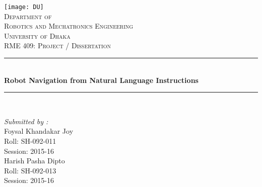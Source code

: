 \begin{titlepage}
		\newcommand{\HRule}{\rule{\linewidth}{0.1mm}}
		\centering %
		
		\centering
		\texttt{[image: DU]}\\
		\textsc{\Large Department of\\ Robotics and Mechatronics Engineering}\\[0.5cm]
		\textsc{\LARGE University of Dhaka}\\[1.cm]
		
		\textsc{\Large RME 409: Project / Dissertation}\\[0.5cm] %
		
		\HRule \\[.5cm]
		{ \LARGE \bfseries Robot Navigation from Natural Language Instructions}\\[0.1cm] %
		\HRule \\[1.5cm]
		
		
		\begin{minipage}{0.4\textwidth}
            \begin{flushleft} \large
                
                \emph{Submitted by :}\\
                Foysal Khandakar Joy\\
                Roll: SH-092-011\\
                Session: 2015-16\\[0.2cm]
                Harish Pasha Dipto\\
                Roll: SH-092-013\\
                Session: 2015-16
            \end{flushleft}
            

\end{minipage}
\end{titlepage}
